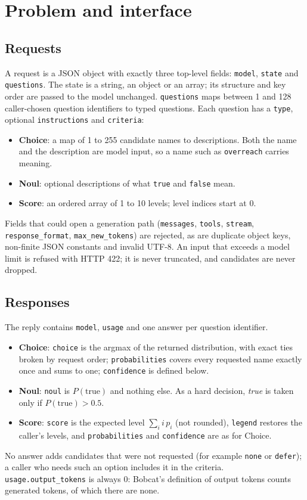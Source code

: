 \section{Problem and interface}
\label{sec:interface}

\subsection{Requests}

A request is a JSON object with exactly three top-level fields: \texttt{model}, \texttt{state}
and \texttt{questions}. The state is a string, an object or an array; its structure and key
order are passed to the model unchanged. \texttt{questions} maps between 1 and 128
caller-chosen question identifiers to typed questions. Each question has a \texttt{type},
optional \texttt{instructions} and \texttt{criteria}:
\begin{itemize}
  \item \textbf{Choice}: a map of 1 to 255 candidate names to descriptions. Both the name
    and the description are model input, so a name such as \texttt{overreach} carries
    meaning.
  \item \textbf{Noul}: optional descriptions of what \texttt{true} and \texttt{false} mean.
  \item \textbf{Score}: an ordered array of 1 to 10 levels; level indices start at 0.
\end{itemize}
Fields that could open a generation path (\texttt{messages}, \texttt{tools},
\texttt{stream}, \texttt{response\_format}, \texttt{max\_new\_tokens}) are rejected, as are
duplicate object keys, non-finite JSON constants and invalid UTF-8. An input that exceeds a
model limit is refused with HTTP 422; it is never truncated, and candidates are never
dropped.

\subsection{Responses}

The reply contains \texttt{model}, \texttt{usage} and one answer per question identifier.
\begin{itemize}
  \item \textbf{Choice}: \texttt{choice} is the argmax of the returned distribution, with
    exact ties broken by request order; \texttt{probabilities} covers every requested
    name exactly once and sums to one; \texttt{confidence} is defined below.
  \item \textbf{Noul}: \texttt{noul} is $P(\text{true})$ and nothing else. As a hard
    decision, \emph{true} is taken only if $P(\text{true}) > 0.5$.
  \item \textbf{Score}: \texttt{score} is the expected level $\sum_i i\,p_i$ (not rounded),
    \texttt{legend} restores the caller's levels, and \texttt{probabilities} and
    \texttt{confidence} are as for Choice.
\end{itemize}
No answer adds candidates that were not requested (for example \texttt{none} or
\texttt{defer}); a caller who needs such an option includes it in the criteria.
\texttt{usage.output\_tokens} is always 0: Bobcat's definition of output tokens counts
generated tokens, of which there are none.

